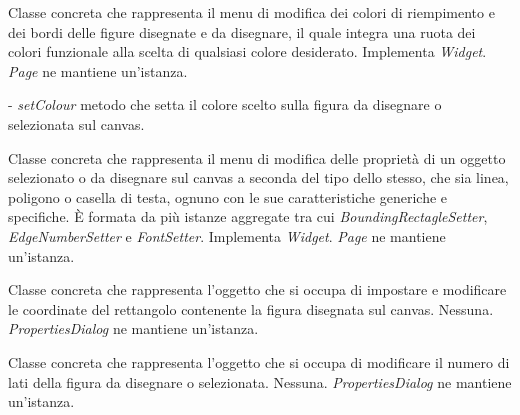 Classe concreta che rappresenta il menu di modifica dei colori di riempimento e dei bordi delle figure disegnate e da disegnare, il quale integra una ruota dei colori funzionale alla scelta di qualsiasi colore desiderato.
Implementa \textit{Widget}.
\textit{Page} ne mantiene un'istanza.
\begin{elencopuntato}[\normindent]
\item[-]  \textit{setColour} metodo che setta il colore scelto sulla figura da disegnare o selezionata sul canvas.
\end{elencopuntato}

Classe concreta che rappresenta  il menu di modifica delle propriet\` a di un oggetto selezionato o da disegnare sul canvas a seconda del tipo dello stesso, che sia linea, poligono o casella di testa, ognuno con le sue caratteristiche generiche e specifiche.
\`E formata da pi\`u istanze aggregate tra cui \textit{BoundingRectagleSetter}, \textit{EdgeNumberSetter} e \textit{FontSetter}. Implementa \textit{Widget}.
\textit{Page} ne mantiene un'istanza.

Classe concreta che rappresenta l'oggetto che si occupa di impostare e modificare le coordinate del rettangolo contenente la figura disegnata sul canvas.
Nessuna.
\textit{PropertiesDialog} ne mantiene un'istanza.

Classe concreta che rappresenta l'oggetto che si occupa di modificare il numero di lati della figura da disegnare o selezionata.
Nessuna.
\textit{PropertiesDialog} ne mantiene un'istanza.

